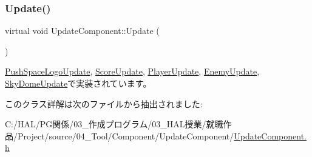 \mbox{\label{class_update_component_ade313ad8bf19a81e7d098aa830d9f01b}} 
\subsubsection{\texorpdfstring{Update()}{Update()}}
{\footnotesize\ttfamily virtual void Update\+Component\+::\+Update (\begin{DoxyParamCaption}{ }\end{DoxyParamCaption})\hspace{0.3cm}{\ttfamily [pure virtual]}}



\mbox{\hyperlink{class_push_space_logo_update_aa07fe6f6f4f072e1f81bc6708dd4727e}{Push\+Space\+Logo\+Update}}, \mbox{\hyperlink{class_score_update_aae2b398784079a651ed92eb4c634b1c9}{Score\+Update}}, \mbox{\hyperlink{class_player_update_af6e1b8ca60399f232e64d2acb4968c75}{Player\+Update}}, \mbox{\hyperlink{class_enemy_update_ae9662f3a2d064dc69c0d68293e60f051}{Enemy\+Update}}, \mbox{\hyperlink{class_sky_dome_update_ae163cb90e4de561fe1f7b2cb311be331}{Sky\+Dome\+Update}}で実装されています。



このクラス詳解は次のファイルから抽出されました\+:\begin{DoxyCompactItemize}
\item 
C\+:/\+H\+A\+L/\+P\+G関係/03\+\_\+作成プログラム/03\+\_\+\+H\+A\+L授業/就職作品/\+Project/source/04\+\_\+\+Tool/\+Component/\+Update\+Component/\mbox{\hyperlink{_update_component_8h}{Update\+Component.\+h}}\end{DoxyCompactItemize}
